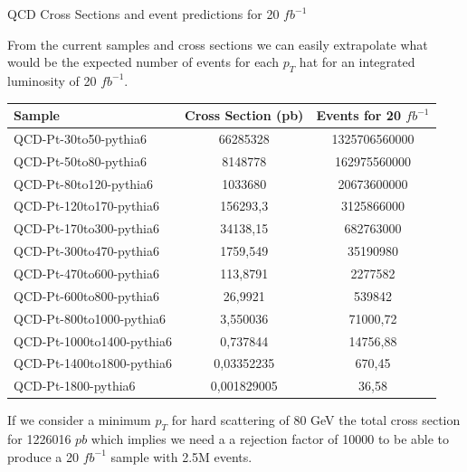 \documentclass[8pt]{beamer}
\begin{document}
\begin{frame}{QCD Cross Sections and event predictions for 20 $fb^{-1}$}

From the current samples and cross sections we can easily extrapolate what would be the expected
number of events for each $p_T$ hat for an integrated luminosity of 20 $fb^{-1}$.

\begin{block}

\centering
\begin{tabular}{|l||c|c|}
\hline
\hline \hline
Sample & Cross Section (pb) & Events for 20 $fb^{-1}$ \\
\hline \hline
QCD-Pt-30to50-pythia6     & 66285328    & 1325706560000 \\
QCD-Pt-50to80-pythia6     & 8148778     & 162975560000 \\
QCD-Pt-80to120-pythia6    & 1033680     & 20673600000 \\
QCD-Pt-120to170-pythia6   & 156293,3    & 3125866000 \\
QCD-Pt-170to300-pythia6   & 34138,15    & 682763000 \\
QCD-Pt-300to470-pythia6   & 1759,549    & 35190980 \\
QCD-Pt-470to600-pythia6   & 113,8791    & 2277582 \\
QCD-Pt-600to800-pythia6   & 26,9921     & 539842 \\
QCD-Pt-800to1000-pythia6  & 3,550036    & 71000,72 \\
QCD-Pt-1000to1400-pythia6 & 0,737844    & 14756,88 \\
QCD-Pt-1400to1800-pythia6 & 0,03352235  & 670,45 \\
QCD-Pt-1800-pythia6       & 0,001829005 & 36,58 \\
\hline
\end{tabular}

\end{block}

If we consider a minimum $p_T$ for hard scattering of 80 GeV the total cross section for 1226016 $pb$ which
implies we need a a rejection factor of 10000 to be able to produce a 20 $fb^{-1}$ sample with 2.5M 
events.

\end{frame}
\end{document}
